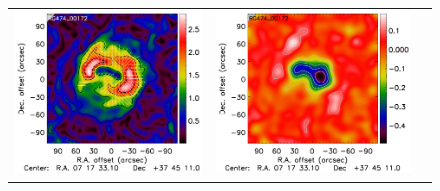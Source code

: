 \documentclass[traditabstract]{aa}
\begin{document}
\begin{figure}[h]
{\begin{tabular}{lll}
\includegraphics[trim=2.3cm 2.2cm 0cm 0cm, clip=true, scale=1]{Figure/Grad_RG474_00172_Ymap_zobs0p9_processed_15_15_45.pdf} & 
\includegraphics[trim=2.3cm 2.2cm 0cm 0cm, clip=true, scale=1]{Figure/DoG_RG474_00172_Ymap_zobs0p9_processed_15_15_45.pdf} \\

\end{tabular}}
\end{figure}
\end{document}

